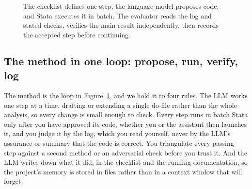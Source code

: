 \begin{figure}[htbp]
\centering
{}
\caption[The checked proposal loop]{The checklist defines one step, the language model proposes code, and Stata executes it in batch. The evaluator reads the log and stated checks, verifies the main result independently, then records the accepted step before continuing.}
\label{fig:backbone}
\end{figure}

\subsection{The method in one loop: propose, run, verify, log}
The method is the loop in Figure~\ref{fig:backbone}, and we hold it to four rules. The LLM works one step at a time, drafting or extending a single do-file rather than the whole analysis, so every change is small enough to check. Every step runs in batch Stata only after you have approved its code, whether you or the assistant then launches it, and you judge it by the log, which you read yourself, never by the LLM's assurance or summary that the code is correct. You triangulate every passing step against a second method or an adversarial check before you trust it. And the LLM writes down what it did, in the checklist and the running documentation, so the project's memory is stored in files rather than in a context window that will forget.

